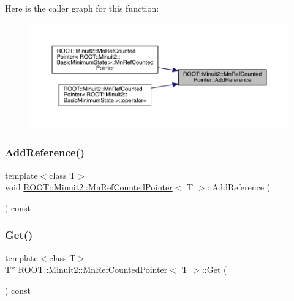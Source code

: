 Here is the caller graph for this function\+:\nopagebreak
\begin{figure}[H]
\begin{center}
\leavevmode
\includegraphics[width=350pt]{d5/d13/classROOT_1_1Minuit2_1_1MnRefCountedPointer_a9a8d01a9009e9a9b272c14e46cbeb4d5_icgraph}
\end{center}
\end{figure}
\mbox{\label{classROOT_1_1Minuit2_1_1MnRefCountedPointer_a9a8d01a9009e9a9b272c14e46cbeb4d5}} 
\subsubsection{\texorpdfstring{AddReference()}{AddReference()}\hspace{0.1cm}{\footnotesize\ttfamily [2/2]}}
{\footnotesize\ttfamily template$<$class T$>$ \\
void \mbox{\hyperlink{classROOT_1_1Minuit2_1_1MnRefCountedPointer}{R\+O\+O\+T\+::\+Minuit2\+::\+Mn\+Ref\+Counted\+Pointer}}$<$ T $>$\+::Add\+Reference (\begin{DoxyParamCaption}{ }\end{DoxyParamCaption}) const\hspace{0.3cm}{\ttfamily [inline]}}

\mbox{\label{classROOT_1_1Minuit2_1_1MnRefCountedPointer_ae88bd272c286587bad6200c41c66909b}} 
\subsubsection{\texorpdfstring{Get()}{Get()}\hspace{0.1cm}{\footnotesize\ttfamily [1/2]}}
{\footnotesize\ttfamily template$<$class T$>$ \\
T$\ast$ \mbox{\hyperlink{classROOT_1_1Minuit2_1_1MnRefCountedPointer}{R\+O\+O\+T\+::\+Minuit2\+::\+Mn\+Ref\+Counted\+Pointer}}$<$ T $>$\+::Get (\begin{DoxyParamCaption}{ }\end{DoxyParamCaption}) const\hspace{0.3cm}{\ttfamily [inline]}}

